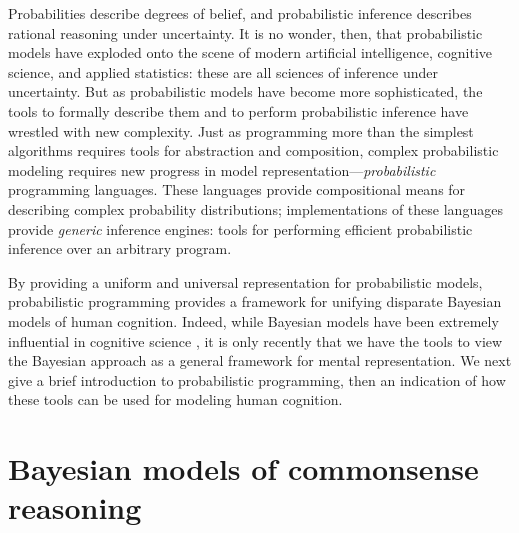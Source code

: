 \documentclass[12pt]{article}
\begin{document}
Probabilities describe degrees of belief, and probabilistic inference describes rational reasoning under uncertainty. It is no wonder, then, that probabilistic models have exploded onto the scene of modern artificial intelligence, cognitive science, and applied statistics: these are all sciences of inference under uncertainty. But as probabilistic models have become more sophisticated, the tools to formally describe them and to perform probabilistic inference have wrestled with new complexity. Just as programming more than the simplest algorithms requires tools for abstraction and composition, complex probabilistic modeling requires new progress in model representation---\emph{probabilistic} programming languages. These languages provide compositional means for describing complex probability distributions; implementations of these languages provide \emph{generic} inference engines: tools for performing efficient probabilistic inference over an arbitrary program. 

By providing a uniform and universal representation for probabilistic models, probabilistic programming provides a framework for unifying disparate Bayesian models of human cognition. Indeed, while Bayesian models have been extremely influential in cognitive science \cite[e.g.][]{tenenbaum2011}, 
it is only recently that we have the tools to view the Bayesian approach as a general framework for mental representation.
We next give a brief introduction to probabilistic programming, then an indication of how these tools can be used for modeling human cognition.




\section{Bayesian models of commonsense reasoning}

  
  
  
\end{document}
